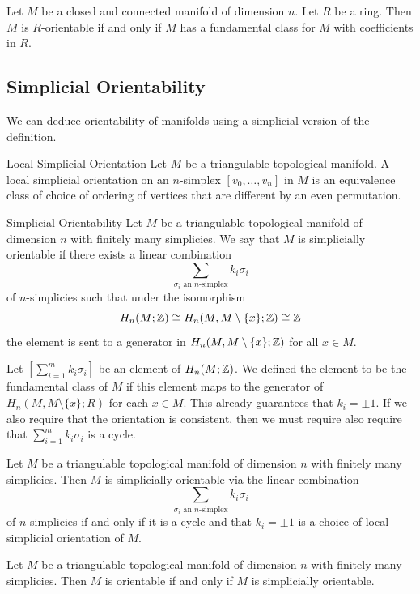 \documentclass[a4paper]{article}
\begin{document}
\begin{lmm}{}{} Let $M$ be a closed and connected manifold of dimension $n$. Let $R$ be a ring. Then $M$ is $R$-orientable if and only if $M$ has a fundamental class for $M$ with coefficients in $R$. 
\end{lmm}

\subsection{Simplicial Orientability}
We can deduce orientability of manifolds using a simplicial version of the definition. 

\begin{defn}{Local Simplicial Orientation}{} Let $M$ be a triangulable topological manifold. A local simplicial orientation on an $n$-simplex $[v_0,\dots,v_n]$ in $M$ is an equivalence class of choice of ordering of vertices that are different by an even permutation. 
\end{defn}

\begin{defn}{Simplicial Orientability}{} Let $M$ be a triangulable topological manifold of dimension $n$ with finitely many simplicies. We say that $M$ is simplicially orientable if there exists a linear combination $$\sum_{\sigma_i\text{ an }n\text{-simplex}}k_i\sigma_i$$ of $n$-simplicies such that under the isomorphism $$H_n(M;\mathbb{Z})\cong H_n(M,M\setminus\{x\};\mathbb{Z})\cong\mathbb{Z}$$ the element is sent to a generator in $H_n(M,M\setminus\{x\};\mathbb{Z})$ for all $x\in M$. 
\end{defn}

Let $\left[\sum_{i=1}^mk_i\sigma_i\right]$ be an element of $H_n(M;\mathbb{Z})$. We defined the element to be the fundamental class of $M$ if this element maps to the generator of $H_n(M,M\setminus\{x\};R)$ for each $x\in M$. This already guarantees that $k_i=\pm1$. If we also require that the orientation is consistent, then we must require also require that $\sum_{i=1}^mk_i\sigma_i$ is a cycle. 

\begin{prp}{}{} Let $M$ be a triangulable topological manifold of dimension $n$ with finitely many simplicies. Then $M$ is simplicially orientable via the linear combination $$\sum_{\sigma_i\text{ an }n\text{-simplex}}k_i\sigma_i$$ of $n$-simplicies if and only if it is a cycle and that $k_i=\pm 1$ is a choice of local simplicial orientation of $M$. 
\end{prp}

\begin{thm}{}{} Let $M$ be a triangulable topological manifold of dimension $n$ with finitely many simplicies. Then $M$ is orientable if and only if $M$ is simplicially orientable. 
\end{thm}
\end{document}
